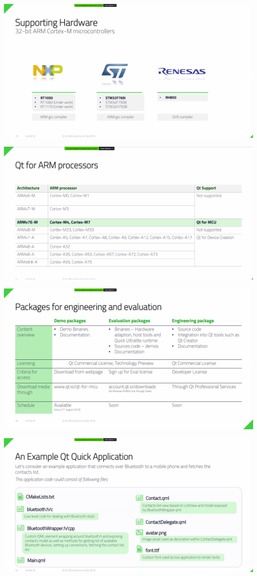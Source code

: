 \documentclass[11pt]{article}
\begin{document}
\begin{center}
\includegraphics[width=.9\linewidth]{gorseller/qt1.png}
\end{center}
\begin{center}
\includegraphics[width=.9\linewidth]{gorseller/qt2.png}
\end{center}
\begin{center}
\includegraphics[width=.9\linewidth]{gorseller/qt3.png}
\end{center}
\begin{center}
\includegraphics[width=.9\linewidth]{gorseller/qt4.png}
\end{center}
\end{document}
